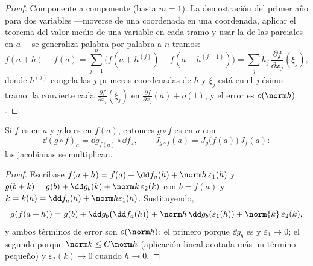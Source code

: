 \begin{proof}
Componente a componente (basta $m = 1$). La demostración del primer
año para dos variables ---moverse de una coordenada en una
coordenada, aplicar el teorema del valor medio de una variable en
cada tramo y usar la  de las parciales en $a$--- se
generaliza palabra por palabra a $n$ tramos:
\[
f(a + h) - f(a) = \sum_{j=1}^{n} \bigl(f(a + h^{(j)}) - f(a +
h^{(j-1)})\bigr)
= \sum_j h_j\,\frac{\partial f}{\partial x_j}(\xi_j),
\]
donde $h^{(j)}$ congela las $j$ primeras coordenadas de $h$ y $\xi_j$
está en el $j$-ésimo tramo; la  convierte cada
$\frac{\partial f}{\partial x_j}(\xi_j)$ en $\frac{\partial
f}{\partial x_j}(a) + o(1)$, y el error es $o(\norm h)$.
\end{proof}

\begin{theorem}\label{thm:b2:diffcalc:chainrule}
Si $f$ es  en $a$ y $g$ lo es en $f(a)$, entonces $g
\circ f$ es  en $a$ con
\[
\dd(g \circ f)_a = \dd g_{f(a)} \circ \dd f_a ,
\qquad
J_{g\circ f}(a) = J_g\bigl(f(a)\bigr)\,J_f(a) :
\]
las jacobianas se multiplican.
\end{theorem}

\begin{proof}
Escríbase $f(a + h) = f(a) + \dd f_a(h) + \norm h\,\varepsilon_1(h)$
y $g(b + k) = g(b) + \dd g_b(k) + \norm k\,\varepsilon_2(k)$ con $b =
f(a)$ y $k = k(h) = \dd f_a(h) + \norm h \varepsilon_1(h)$.
Sustituyendo,
\[
g(f(a+h)) = g(b) + \dd g_b\bigl(\dd f_a(h)\bigr)
+ \norm h\,\dd g_b(\varepsilon_1(h)) + \norm{k}\,\varepsilon_2(k),
\]
y ambos términos de error son $o(\norm h)$: el primero porque $\dd
g_b$ es  y $\varepsilon_1 \to 0$; el segundo porque $\norm k
\leq C\norm h$ (aplicación lineal acotada más un término pequeño) y
$\varepsilon_2(k) \to 0$ cuando $h \to 0$.
\end{proof}

